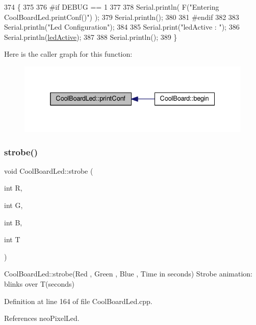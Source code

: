 \begin{DoxyCode}
374 \{
375 
376 \textcolor{preprocessor}{#if DEBUG == 1 }
377 
378     Serial.println( F(\textcolor{stringliteral}{"Entering CoolBoardLed.printConf()"}) );
379     Serial.println();
380 
381 \textcolor{preprocessor}{#endif}
382 
383     Serial.println(\textcolor{stringliteral}{"Led Configuration"});
384 
385     Serial.print(\textcolor{stringliteral}{"ledActive : "});
386     Serial.println(\hyperlink{classCoolBoardLed_a5f17c135516fcf4b44ea8a096ba0177a}{ledActive});
387 
388     Serial.println();   
389 \}
\end{DoxyCode}
Here is the caller graph for this function\+:
\nopagebreak
\begin{figure}[H]
\begin{center}
\leavevmode
\includegraphics[width=332pt]{classCoolBoardLed_a8ed3053a36f0ed4a131f43b5b17efb61_icgraph}
\end{center}
\end{figure}
\mbox{\label{classCoolBoardLed_adc08c0ac07473499971c503d300f0413}} 
\subsubsection{\texorpdfstring{strobe()}{strobe()}}
{\footnotesize\ttfamily void Cool\+Board\+Led\+::strobe (\begin{DoxyParamCaption}\item[{int}]{R,  }\item[{int}]{G,  }\item[{int}]{B,  }\item[{int}]{T }\end{DoxyParamCaption})}

Cool\+Board\+Led\+::strobe(\+Red , Green , Blue , Time in seconds) Strobe animation\+: blinks over T(seconds) 

Definition at line 164 of file Cool\+Board\+Led.\+cpp.



References neo\+Pixel\+Led.


